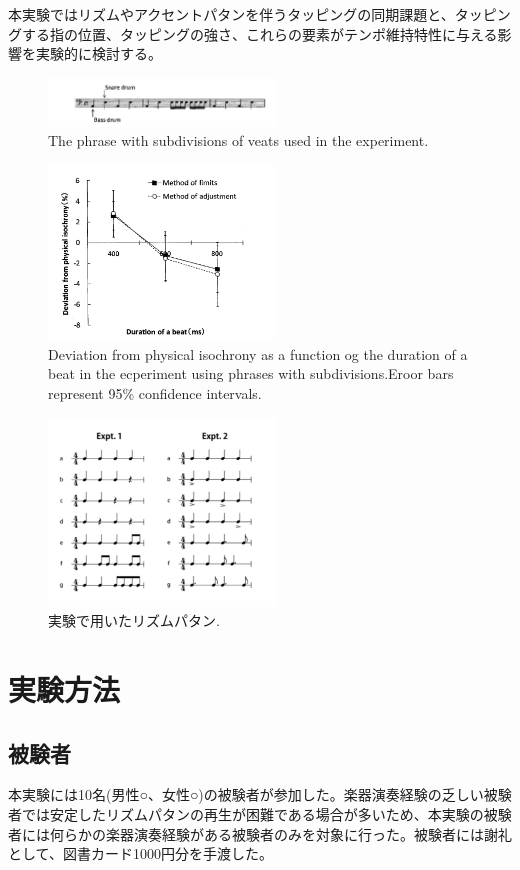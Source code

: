 \documentclass[twocolumn,10pt]{jarticle}
\begin{document}
本実験ではリズムやアクセントパタンを伴うタッピングの同期課題と、タッピングする指の位置、タッピングの強さ、これらの要素がテンポ維持特性に与える影響を実験的に検討する。
\begin{figure}
  \centering
  \includegraphics[width=6cm]{Arao_f1.jpg}
  \caption{The phrase with subdivisions of veats used in the experiment.\cite{Arao}}
  \label{Arao_f1}
\end{figure}
\begin{figure}
  \centering
  \includegraphics[width=6cm]{Arao_f2.jpg}
  \caption{Deviation from physical isochrony as a function og the duration of a beat in the ecperiment using phrases with subdivisions.Eroor bars represent 95\% confidence intervals.\cite{Arao}}
  \label{Arao_f2}
\end{figure}
\begin{figure}
  \centering
  \includegraphics[width=6cm]{Nagasima.jpg}
  \caption{実験で用いたリズムパタン.\cite{Nagasima}}
  \label{Nagasima}
\end{figure}

\section{実験方法}
\subsection{被験者}
本実験には10名(男性○、女性○)の被験者が参加した。楽器演奏経験の乏しい被験者では安定したリズムパタンの再生が困難である場合が多いため、本実験の被験者には何らかの楽器演奏経験がある被験者のみを対象に行った。被験者には謝礼として、図書カード1000円分を手渡した。
\end{document}
